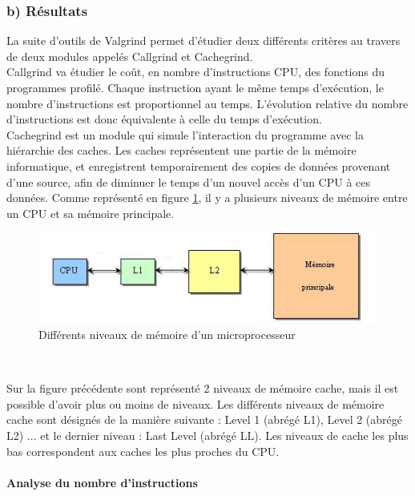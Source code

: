 \documentclass[10pt]{report}
\begin{document}
		\subsubsection{b) Résultats}
		La suite d'outils de Valgrind permet d'étudier deux différents critères au travers de deux modules appelés Callgrind et Cachegrind.\\
		Callgrind va étudier le coût, en nombre d'instructions CPU, des fonctions du programmes profilé. Chaque instruction ayant le même temps d'exécution, le nombre d'instructions est proportionnel au temps. L'évolution relative du nombre d'instructions est donc équivalente à celle du temps d'exécution.\\
		Cachegrind est un module qui simule l'interaction du programme avec la hiérarchie des caches. Les caches représentent une partie de la mémoire informatique, et enregistrent temporairement des copies de données provenant d'une source, afin de diminuer le temps d'un nouvel accès d'un CPU à ces données. Comme représenté en figure \ref{Différents niveaux de mémoire d'un microprocesseur}, il y a plusieurs niveaux de mémoire entre un CPU et sa mémoire principale. 

		\begin{figure}[h!]
			\begin{center}
				\includegraphics[width=13cm]{Reports/figures/Mem_hierarchy.jpg}
			\end{center}	
			\caption{Différents niveaux de mémoire d'un microprocesseur}
			\label{Différents niveaux de mémoire d'un microprocesseur}
		\end{figure}~\par
		Sur la figure précédente sont représenté 2 niveaux de mémoire cache, mais il est possible d'avoir plus ou moins de niveaux.
		Les différents niveaux de mémoire cache sont désignés de la manière suivante : Level 1 (abrégé L1), Level 2 (abrégé L2) ... et le dernier niveau : Last Level (abrégé LL). Les niveaux de cache les plus bas correspondent aux caches les plus proches du CPU. 
		
		\paragraph{Analyse du nombre d'instructions}
%		
		
\end{document}
